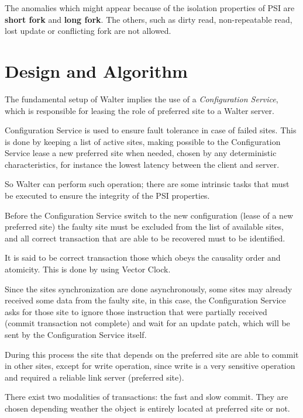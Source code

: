 \documentclass[a4paper]{article}
\begin{document}
The anomalies which might appear because of the isolation properties of PSI are \textbf{short fork} and \textbf{long fork}. The others, such as dirty read, non-repeatable read, lost update or conflicting fork are not allowed. 


\section{Design and Algorithm}

The fundamental setup of Walter implies the use of a \textit{Configuration Service}, which is responsible for leasing the role of preferred site to a Walter server. 

Configuration Service is used to ensure fault tolerance in case of failed sites. This is done by keeping a list of active sites, making possible to the Configuration Service lease a new preferred site when needed, chosen by any deterministic characteristics, for instance the lowest latency between the client and server. 

So Walter can perform such operation; there are some intrinsic tasks that must be executed to ensure the integrity of the PSI properties.

Before the Configuration Service switch to the new configuration (lease of a new preferred site) the faulty site must be excluded from the list of available sites, and all correct transaction that are able to be recovered must to be identified.

It is said to be correct transaction those which obeys the causality order and atomicity. This is done by using Vector Clock. 

Since the sites synchronization are done asynchronously, some sites may already received some data from the faulty site, in this case, the Configuration Service asks for those site to ignore those instruction that were partially received (commit transaction not complete) and wait for an update patch, which will be sent by the Configuration Service itself.

During this process the site that depends on the preferred site are able to commit in other sites, except for write operation, since write is a very sensitive operation and required a reliable link server (preferred site).

There exist two modalities of transactions: the fast and slow commit. They are chosen depending weather the object is entirely located at preferred site  or not.
\end{document}
